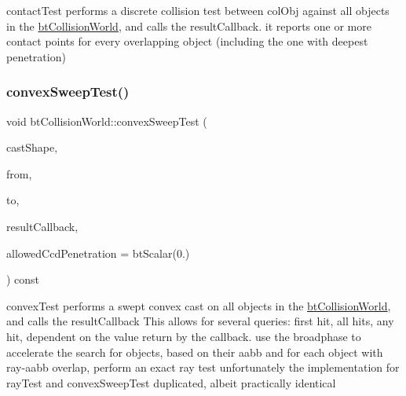 contact\+Test performs a discrete collision test between col\+Obj against all objects in the \hyperlink{classbtCollisionWorld}{bt\+Collision\+World}, and calls the result\+Callback. it reports one or more contact points for every overlapping object (including the one with deepest penetration) \mbox{\label{classbtCollisionWorld_a8dcdf201fe1c98c633682cf3845d237f}} 
\subsubsection{\texorpdfstring{convex\+Sweep\+Test()}{convexSweepTest()}\hspace{0.1cm}{\footnotesize\ttfamily [1/2]}}
{\footnotesize\ttfamily void bt\+Collision\+World\+::convex\+Sweep\+Test (\begin{DoxyParamCaption}\item[{const bt\+Convex\+Shape $\ast$}]{cast\+Shape,  }\item[{const bt\+Transform \&}]{from,  }\item[{const bt\+Transform \&}]{to,  }\item[{\hyperlink{structbtCollisionWorld_1_1ConvexResultCallback}{Convex\+Result\+Callback} \&}]{result\+Callback,  }\item[{bt\+Scalar}]{allowed\+Ccd\+Penetration = {\ttfamily btScalar(0.)} }\end{DoxyParamCaption}) const}

convex\+Test performs a swept convex cast on all objects in the \hyperlink{classbtCollisionWorld}{bt\+Collision\+World}, and calls the result\+Callback This allows for several queries\+: first hit, all hits, any hit, dependent on the value return by the callback. use the broadphase to accelerate the search for objects, based on their aabb and for each object with ray-\/aabb overlap, perform an exact ray test unfortunately the implementation for ray\+Test and convex\+Sweep\+Test duplicated, albeit practically identical \mbox{\label{classbtCollisionWorld_a8dcdf201fe1c98c633682cf3845d237f}} 
